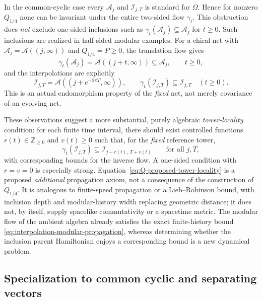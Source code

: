 \documentclass[a4paper,11pt]{article}
\theoremstyle{definition}
\newcommand{\mA}{\mathcal{A}}%
\newcommand{\mN}{\mathcal{N}}
\newcommand{\mI}{\mathcal{I}}
\newcommand{\mM}{\mathcal{M}}
\begin{document}
In the common-cyclic case every $\mA_j$ and $\mI_{j,T}$ is
standard for $\Omega$. Hence for nonzero $Q_{1/4}$ none can be
invariant under the entire two-sided flow $\gamma_t$.
This obstruction does \emph{not} exclude one-sided inclusions such
as $\gamma_t(\mA_j)\subseteq\mA_j$ for $t\geq0$.
Such inclusions are realized in half-sided modular examples.
For a chiral net with $\mA_j=\mathcal A((j,\infty))$ and
$Q_{1/4}=P\geq0$, the translation flow gives
\begin{equation}
 \gamma_t(\mA_j)=\mathcal A((j+t,\infty))
 \subseteq\mA_j,\qquad t\geq0,
 \label{eq:Q-half-sided-tower-locality}
\end{equation}
and the interpolations are explicitly
\begin{equation}
 \mI_{j,T}=\mathcal A((j+e^{-2\pi T},\infty)),\qquad
 \gamma_t(\mI_{j,T})\subseteq\mI_{j,T}\quad(t\geq0).
 \label{eq:Q-half-sided-interpolation-locality}
\end{equation}
This is an actual endomorphism property of the \emph{fixed}
net, not merely covariance of an evolving net.

These observations suggest a more substantial, purely algebraic
\emph{tower-locality} condition: for each finite time interval,
there should exist controlled functions $r(t)\in\mathbb Z_{\geq0}$
and $v(t)\geq0$ such that, for the \emph{fixed} reference tower,
\begin{equation}
 \gamma_t(\mI_{j,T})
 \subseteq\mI_{j-r(t),\,T+v(t)}
 \qquad\text{for all }j,T,
 \label{eq:Q-proposed-tower-locality}
\end{equation}
with corresponding bounds for the inverse flow.
A one-sided condition with $r=v=0$ is especially strong.
Equation~\eqref{eq:Q-proposed-tower-locality} is a proposed
\emph{additional} propagation axiom, not a consequence of the
construction of $Q_{1/4}$. It is analogous to finite-speed
propagation or a Lieb--Robinson bound, with inclusion depth and
modular-history width replacing geometric distance; it does not,
by itself, supply spacelike commutativity or a spacetime metric.
The modular flow of the ambient algebra already satisfies the
exact finite-history bound
\eqref{eq:interpolation-modular-propagation}, whereas determining
whether the inclusion parent Hamiltonian enjoys a corresponding
bound is a new dynamical problem.

\subsection{Specialization to common cyclic and separating vectors}
\label{subsec:probing-common-cyclic}
\end{document}
